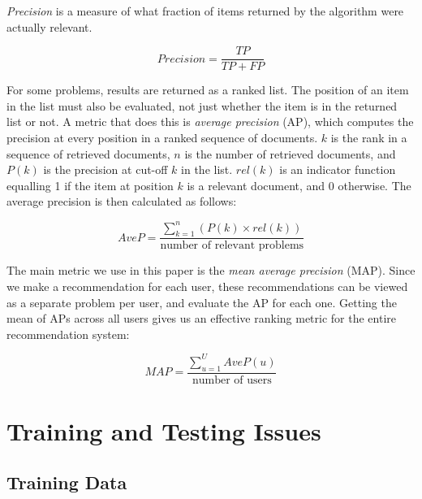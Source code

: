 \emph{Precision} is a measure of what fraction of items returned by
the algorithm were actually relevant.

\[
Precision = \frac {TP} {TP + FP}
\]

For some problems, results are returned as a ranked list. The position
of an item in the list must also be evaluated, not just whether the
item is in the returned list or not. A metric that does this is
\emph{average precision} (AP), which computes the precision at every
position in a ranked sequence of documents. $k$ is the rank in a
sequence of retrieved documents, $n$ is the number of retrieved
documents, and $P(k)$ is the precision at cut-off $k$ in the
list. $rel(k)$ is an indicator function equalling 1 if the item at
position $k$ is a relevant document, and 0 otherwise. The average
precision is then calculated as follows:

\[
AveP = \frac{\sum_{k=1}^n(P(k) \times rel(k))}{\text{number of relevant problems}}
\]

The main metric we use in this paper is the \emph{mean average
precision} (MAP). Since we make a recommendation for each user, these
recommendations can be viewed as a separate problem per user, and
evaluate the AP for each one. Getting the mean of APs across all users
gives us an effective ranking metric for the entire recommendation system:

\[
MAP = \frac{\sum_{u=1}^U AveP(u)}{\text{number of users}}
\]

\section{Training and Testing Issues}

\subsection{Training Data}

